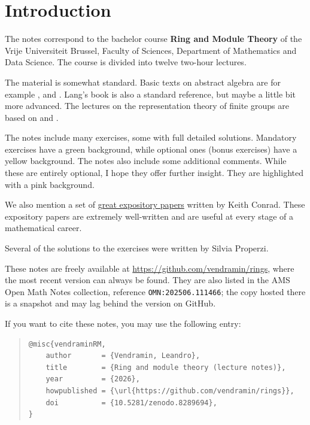 \section*{Introduction}

The notes correspond to the bachelor 
course \textbf{Ring and Module Theory} of the 
Vrije Universiteit Brussel, 
Faculty of Sciences, 
Department of Mathematics and Data Science. The course
is divided into twelve two-hour lectures. 

The material is somewhat standard. Basic texts on abstract algebra
are for example \cite{MR1129886}, \cite{MR2286236} and \cite{MR600654}. 
Lang's book \cite{MR783636} is also a standard reference, but 
maybe a little bit more advanced. 
The lectures on the representation theory of finite groups are based on
\cite{MR0450380} and \cite{MR2867444}.

The notes include many exercises, some with full detailed solutions. Mandatory exercises have a \colorbox{green!5!white}{green background}, while optional ones (bonus exercises) have a \colorbox{yellow!15!white}{yellow background}.
The notes also include some additional comments. While these are entirely optional, I hope they offer further insight. They are highlighted with a \colorbox{red!5!white}{pink background}.

We also mention a set of \href{https://kconrad.math.uconn.edu/blurbs/}{great
expository papers} written by Keith Conrad. 
These expository papers are extremely well-written
and are useful at  every stage of a mathematical career. 

Several of the solutions to the exercises were written by Silvia Properzi.

These notes are freely available at \url{https://github.com/vendramin/rings},
where the most recent version can always be found. They are also listed in the
AMS Open Math Notes collection, reference \texttt{OMN:202506.111466}; the copy
hosted there is a snapshot and may lag behind the version on GitHub.

If you want to cite these notes, you may use the following entry:

\vspace{1cm}
{\footnotesize
\begin{quote}
\begin{verbatim}
@misc{vendraminRM,
    author       = {Vendramin, Leandro},
    title        = {Ring and module theory (lecture notes)},
    year         = {2026},
    howpublished = {\url{https://github.com/vendramin/rings}},
    doi          = {10.5281/zenodo.8289694},
}
\end{verbatim}
\end{quote}}
\vspace{.8cm}



